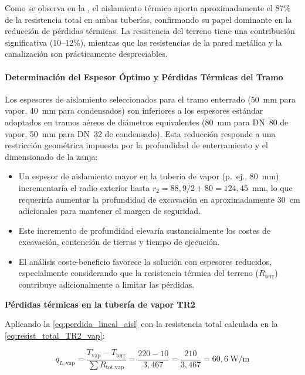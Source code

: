 \documentclass[12pt]{article}
\begin{document}
Como se observa en la , el aislamiento térmico aporta aproximadamente el 87\% de la resistencia total en ambas tuberías, confirmando su papel dominante en la reducción de pérdidas térmicas. La resistencia del terreno tiene una contribución significativa (10--12\%), mientras que las resistencias de la pared metálica y la canalización son prácticamente despreciables.

\paragraph{Determinación del Espesor Óptimo y Pérdidas Térmicas del Tramo}
\label{par:espesor_optimo_perdidas}

Los espesores de aislamiento seleccionados para el tramo enterrado (50~mm para vapor, 40~mm para condensados) son inferiores a los espesores estándar adoptados en tramos aéreos de diámetros equivalentes (80~mm para DN~80 de vapor, 50~mm para DN~32 de condensado). Esta reducción responde a una restricción geométrica impuesta por la profundidad de enterramiento y el dimensionado de la zanja:

\begin{itemize}[noitemsep]
	\item Un espesor de aislamiento mayor en la tubería de vapor (p.~ej., 80~mm) incrementaría el radio exterior hasta $r_2 = 88{,}9/2 + 80 = 124{,}45$~mm, lo que requeriría aumentar la profundidad de excavación en aproximadamente 30~cm adicionales para mantener el margen de seguridad.
	\item Este incremento de profundidad elevaría sustancialmente los costes de excavación, contención de tierras y tiempo de ejecución.
	\item El análisis coste-beneficio favorece la solución con espesores reducidos, especialmente considerando que la resistencia térmica del terreno ($R_{\text{terr}}$) contribuye adicionalmente a limitar las pérdidas.
\end{itemize}

\textbf{Pérdidas térmicas en la tubería de vapor TR2}

Aplicando la \eqref{eq:perdida_lineal_aisl} con la resistencia total calculada en la \eqref{eq:resist_total_TR2_vap}:

\begin{equation}
	q_{L,\text{vap}} = \frac{T_{\text{vap}} - T_{\text{terr}}}{\sum R_{\text{tot,vap}}} = \frac{220 - 10}{3{,}467} = \frac{210}{3{,}467} = 60{,}6~\text{W/m}
	\label{eq:perdida_lineal_TR2_vap}
\end{equation}
\end{document}
